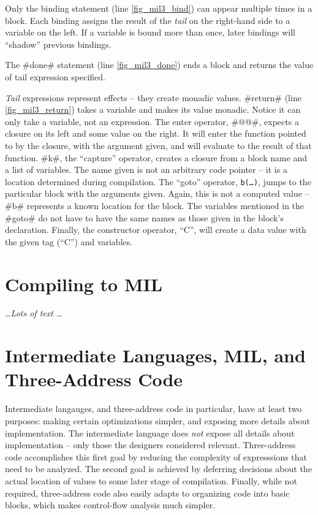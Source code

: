 \documentclass[12pt]{report}
\begin{document}
Only the binding statement (line \ref{fig_mil3_bind}) can appear multiple
times in a block. Each binding assigns the result of the \emph{tail}
on the right-hand side to a variable on the left. If a variable is
bound more than once, later bindings will ``shadow'' previous
bindings.

The #done# statement (line \ref{fig_mil3_done}) ends a block and returns
the value of tail expression specified.

\emph{Tail} expressions represent effects -- they create monadic
values. #return# (line \ref{fig_mil3_return}) takes a variable and
makes its value monadic. Notice it can only take a variable, not an
expression.  The enter operator, #@@#, expects a closure on its left
and some value on the right. It will enter the function pointed to by
the closure, with the argument given, and will evaluate to the result
of that function. #k#, the ``capture'' operator, creates a closure
from a block name and a list of variables. The name given is not an
arbitrary code pointer -- it is a location determined during
compilation. The ``goto'' operator, \texttt{b(\dots)}, jumps to the
particular block with the arguments given. Again, this is not a
computed value -- #b# represents a known location for the
block. The variables mentioned in the #goto# do not have to have the
same names as those given in the block's declaration. Finally, the
constructor operator, ``C'', will create a data value with the given
tag (``C'') and variables.

\section{Compiling \lamA to MIL}

\emph{\dots Lots of text \dots}

\section{Intermediate Languages, MIL, and Three-Address Code}

Intermediate langauges, and three-address code in particular, have at
least two purposes: making certain optimizations simpler, and exposing
more details about implementation. The intermediate language does
\emph{not} expose all details about implementation -- only those the
designers considered relevant. Three-address code accomplishes this
first goal by reducing the complexity of expresssions that need to be
analyzed. The second goal is achieved by deferring decisions about the
actual location of values to some later stage of compilation.
Finally, while not required, three-address code also easily adapts to
organizing code into basic blocks, which makes control-flow analysis
much simpler.
\end{document}

